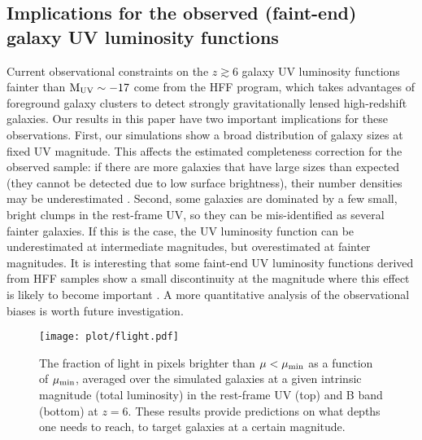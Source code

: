 \documentclass[useAMS,usenatbib]{mn2e}
\begin{document}
\subsection{Implications for the observed (faint-end) galaxy UV luminosity functions}
\label{sec:hff}
Current observational constraints on the $z\gtrsim6$ galaxy UV luminosity functions fainter than $\rm M_{UV}\sim-17$ come from the HFF program, which takes advantages of foreground galaxy clusters to detect strongly gravitationally lensed high-redshift galaxies. Our results in this paper have two important implications for these observations. First, our simulations show a broad distribution of galaxy sizes at fixed UV magnitude. This affects the estimated completeness correction for the observed sample: if there are more galaxies that have large sizes than expected (they cannot be detected due to low surface brightness), their number densities may be underestimated \citep{bouwens.2017:small.galaxy.sizes}. Second, some galaxies are dominated by a few small, bright clumps in the rest-frame UV, so they can be mis-identified as several fainter galaxies. If this is the case, the UV luminosity function can be underestimated at intermediate magnitudes, but overestimated at fainter magnitudes. It is interesting that some faint-end UV luminosity functions derived from HFF samples show a small discontinuity at the magnitude where this effect is likely to become important \citep[although it may also be caused by other effects, e.g.][]{bouwens.2017:lensing.uncertainty,livermore.2017:faint.galaxies}. A more quantitative analysis of the observational biases is worth future investigation.

\begin{figure}
\centering
\texttt{[image: plot/flight.pdf]} 
\caption{The fraction of light in pixels brighter than $\mu<\mu_{\rm min}$ as a function of $\mu_{\rm min}$, averaged over the simulated galaxies at a given intrinsic magnitude (total luminosity) in the rest-frame UV (top) and B band (bottom) at $z=6$. These results provide predictions on what depths one needs to reach, to target galaxies at a certain magnitude.}
\label{fig:flight}
\end{figure}
\end{document}
